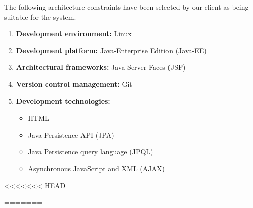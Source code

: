 \begin{flushleft}
	The following architecture constraints have 
	been selected by our client as being 
	suitable for the system.
\end{flushleft}

\begin{enumerate}
	
	\item \textbf{Development environment:} Linux
	\item \textbf{Development platform:} Java-Enterprise Edition (Java-EE) 
	\item \textbf{Architectural frameworks:} Java Server Faces (JSF)
	\item \textbf{Version control management:} Git
	\item \textbf{Development technologies:}
	
	\begin{itemize}
		\item HTML
		\item Java Persistence API (JPA)
		\item Java Persistence query language (JPQL)
		\item Asynchronous JavaScript and XML (AJAX)
	\end{itemize}
		
\end{enumerate}
<<<<<<< HEAD
		
=======

